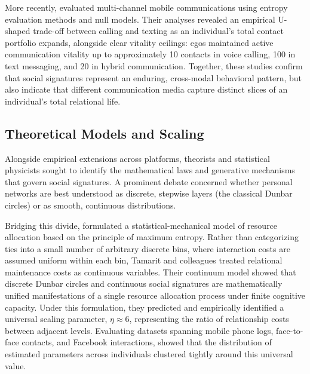 \documentclass[11pt,letterpaper]{article}
\begin{document}
More recently, \citet{liu2024uncovering} evaluated multi-channel mobile communications using entropy evaluation methods and null models. Their analyses revealed an empirical U-shaped trade-off between calling and texting as an individual's total contact portfolio expands, alongside clear vitality ceilings: egos maintained active communication vitality up to approximately 10 contacts in voice calling, 100 in text messaging, and 20 in hybrid communication. Together, these studies confirm that social signatures represent an enduring, cross-modal behavioral pattern, but also indicate that different communication media capture distinct slices of an individual's total relational life.

\subsection{Theoretical Models and Scaling}

Alongside empirical extensions across platforms, theorists and statistical physicists sought to identify the mathematical laws and generative mechanisms that govern social signatures. A prominent debate concerned whether personal networks are best understood as discrete, stepwise layers (the classical Dunbar circles) or as smooth, continuous distributions.

Bridging this divide, \citet{tamarit2022beyond} formulated a statistical-mechanical model of resource allocation based on the principle of maximum entropy. Rather than categorizing ties into a small number of arbitrary discrete bins, where interaction costs are assumed uniform within each bin, Tamarit and colleagues treated relational maintenance costs as continuous variables. Their continuum model showed that discrete Dunbar circles and continuous social signatures are mathematically unified manifestations of a single resource allocation process under finite cognitive capacity. Under this formulation, they predicted and empirically identified a universal scaling parameter, $\eta \approx 6$, representing the ratio of relationship costs between adjacent levels. Evaluating datasets spanning mobile phone logs, face-to-face contacts, and Facebook interactions, \citet{tamarit2022beyond} showed that the distribution of estimated parameters across individuals clustered tightly around this universal value.
\end{document}
